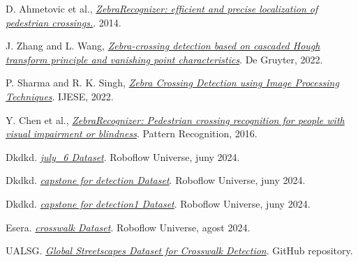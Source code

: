 \documentclass[10pt,a4paper,twocolumn,twoside]{article}
\begin{document}
\begin{thebibliography}{9}
	D. Ahmetovic et al., \textit{\href{https://dragan.ahmetovic.it/pdf/ahmetovic2014zebrarecognizer.pdf}{ZebraRecognizer: efficient and precise localization of pedestrian crossings.}}. 2014.
	
	J. Zhang and L. Wang, \textit{\href{https://www.degruyterbrill.com/document/doi/10.1515/comp-2022-0260/html}{Zebra-crossing detection based on cascaded Hough transform principle and vanishing point characteristics}}. De Gruyter, 2022.
	
	P. Sharma and R. K. Singh, \textit{\href{https://www.ijese.org/wp-content/uploads/Papers/v13i3/B104214020125.pdf}{Zebra Crossing Detection using Image Processing Techniques}}. IJESE, 2022.
	
	Y. Chen et al., \textit{\href{https://www.sciencedirect.com/science/article/abs/pii/S0031320316300826}{ZebraRecognizer: Pedestrian crossing recognition for people with visual impairment or blindness}}. Pattern Recognition, 2016.
	
	
	Dkdkd. \href{https://universe.roboflow.com/dkdkd/july_6}{\textit{july\_6 Dataset}}. Roboflow Universe, juny 2024.
	
	Dkdkd. \href{https://universe.roboflow.com/dkdkd/capstone-for-detection}{\textit{capstone for detection Dataset}}. Roboflow Universe, juny 2024.
	
	Dkdkd. \href{https://universe.roboflow.com/dkdkd/capstone-for-detection1}{\textit{capstone for detection1 Dataset}}. Roboflow Universe, juny 2024.
	
	Esera. \href{https://universe.roboflow.com/esera/crosswalk-cz3sx}{\textit{crosswalk Dataset}}. Roboflow Universe, agost 2024.
	
	UALSG. \href{https://github.com/ualsg/global-streetscapes}{\textit{Global Streetscapes Dataset for Crosswalk Detection}}. GitHub repository.
	
	
	
\end{thebibliography}
\end{document}
